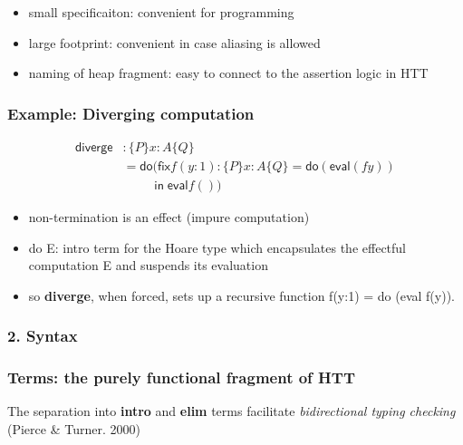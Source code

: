 \documentclass[xcolor=dvipsnames,9pt,hide notes,mathserif]{beamer}
\newcommand{\fix}{\ensuremath{\mathsf{fix}}}
\newcommand{\eval}{\ensuremath{\mathsf{eval}}}
\newcommand{\diverge}{\ensuremath{\mathsf{diverge}}}
\begin{document}



\begin{frame}
  \frametitle{}

  \begin{itemize}
  \item small specificaiton: convenient for programming
  \item large footprint: convenient in case aliasing is allowed
  \item naming of heap fragment: easy to connect to the assertion logic in HTT
  \end{itemize}

\end{frame}





\begin{frame}
  \frametitle{Example: Diverging computation}
\begin{align*}
    \diverge &: \{P\} x{:}A \{Q\} \\
   &= \mathsf{do} (\fix f(y{:}1) : \{P\} x{:}A \{Q\} = \mathsf{do} (\eval (f y))\\
    &\phantom{XXX}\mathsf{in} \; \eval f ())
\end{align*}

  \begin{itemize}
  \item non-termination is an effect (impure computation)
  \item do E: intro term for the Hoare type which encapsulates the effectful computation E and suspends its evaluation
  \item so {\bf diverge}, when forced, sets up a recursive function 
    f(y:1) = do (eval f(y)).
  \end{itemize}

\end{frame}





\begin{frame}
  \frametitle{2. Syntax}
\end{frame}







\begin{frame}
  \frametitle{Terms: the purely functional fragment of HTT}
  The separation into {\bf intro} and {\bf elim} terms facilitate \textit{bidirectional typing checking} (Pierce \& Turner. 2000)
\end{frame}
\end{document}
